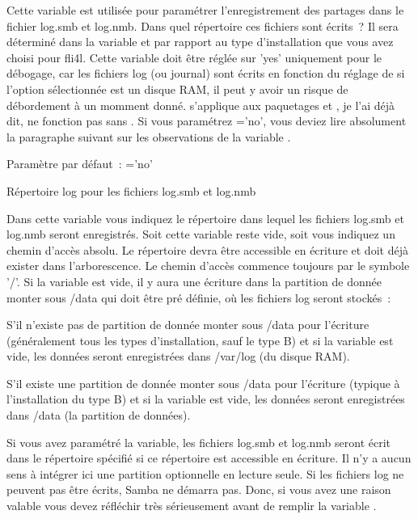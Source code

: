 \begin{description}
    Cette variable est utilisée pour paramétrer l'enregistrement des partages
    dans le fichier log.smb et log.nmb. Dans quel répertoire ces fichiers sont
    écrits~? Il sera déterminé dans la variable 
    et par rapport au type d'installation que vous avez choisi pour fli4l. Cette
    variable doit être réglée sur 'yes' uniquement pour le débogage, car les
    fichiers log (ou journal) sont écrits en fonction du réglage de 
    si l'option sélectionnée est un disque RAM, il peut y avoir un risque de
    débordement à un momment donné.  s'applique aux paquetages 
    et , je l'ai déjà dit, 
    ne fonction pas sans . Si vous paramétrez ='no',
    vous deviez lire absolument la paragraphe suivant sur les observations de la
    variable .

    Paramètre par défaut~: ='no'



    Répertoire log pour les fichiers log.smb et log.nmb

    Dans cette variable vous indiquez le répertoire dans lequel les fichiers
    log.smb et log.nmb seront enregistrés. Soit cette variable reste vide, soit
    vous indiquez un chemin d'accès absolu. Le répertoire devra être accessible
    en écriture et doit déjà exister dans l'arborescence. Le chemin d'accès
    commence toujours par le symbole '/'. Si la variable est vide, il y aura
    une écriture dans la partition de donnée monter sous /data qui doit être
    pré définie, où les fichiers log seront stockés~:

    S'il n'existe pas de partition de donnée monter sous /data pour l'écriture
    (généralement tous les types d'installation, sauf le type B) et si la variable
     est vide, les données seront enregistrées dans /var/log
    (du disque RAM).

    S'il existe une partition de donnée monter sous /data pour l'écriture
    (typique à l'installation du type B) et si la variable 
    est vide, les données seront enregistrées dans /data (la partition de données).

    Si vous avez paramétré la variable, les fichiers log.smb et log.nmb seront
    écrit dans le répertoire spécifié si ce répertoire est accessible en écriture.
    Il n'y a aucun sens à intégrer ici une partition optionnelle en lecture seule.
    Si les fichiers log ne peuvent pas être écrits, Samba ne démarra pas. Donc,
    si vous avez une raison valable vous devez réfléchir très sérieusement avant
    de remplir la variable .


\end{description}
